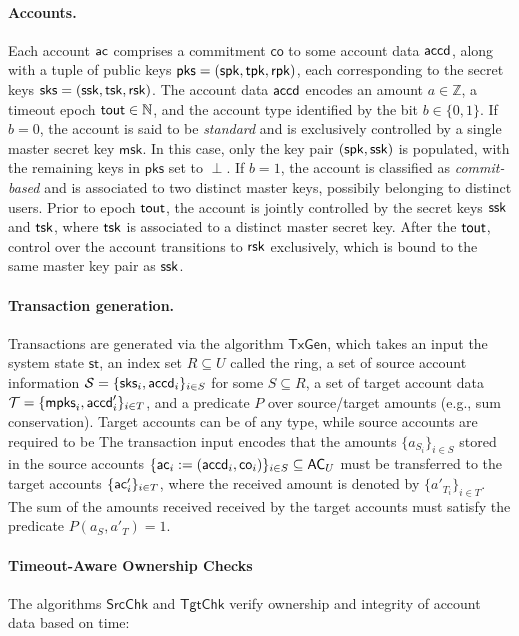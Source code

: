 \paragraph*{Accounts.}
Each account $\mathsf{ac}$ comprises a commitment $\mathsf{co}$ to some account data $\mathsf{accd}$, along with a tuple of public keys $\mathsf{pks} = ( \mathsf{spk}, \mathsf{tpk}, \mathsf{rpk} )$, each corresponding to the secret keys  $\mathsf{sks} = ( \mathsf{ssk}, \mathsf{tsk}, \mathsf{rsk} )$. The account data $\mathsf{accd}$ encodes an amount $a \in \mathbb{Z}$, a timeout epoch $\mathsf{tout} \in \mathbb{N}$, and the account type identified by the bit $b \in \{ 0, 1 \}$. If $b = 0$, the account is said to be \textit{standard} and is exclusively controlled by a single master secret key $\mathsf{msk}$. In this case, only the key pair $(\mathsf{spk}, \mathsf{ssk})$ is populated, with the remaining keys in $\mathsf{pks}$ set to $\perp$. If $b = 1$, the account is classified as \textit{commit-based} and is associated to two distinct master keys, possibily belonging to distinct users. Prior to epoch $\mathsf{tout}$, the account is jointly controlled by the secret keys $\mathsf{ssk}$ and $\mathsf{tsk}$, where $\mathsf{tsk}$ is associated to a distinct master secret key. After the $\mathsf{tout}$, control over the account transitions to  $\mathsf{rsk}$ exclusively, which is bound to the same master key pair as $\mathsf{ssk}$.

\paragraph*{Transaction generation.} Transactions are generated via the algorithm $\mathsf{TxGen}$, which takes an input the system state $\mathsf{st}$, an index set $R \subseteq U$ called the ring, a set of source account information  $\mathcal{S} = \{ \mathsf{sks}_i, \mathsf{accd}_i \}_{i \in S}$ for some $S \subseteq R$, a set of target account data $\mathcal{T} = \{ \mathsf{mpks}_i, \mathsf{accd}'_i \}_{i \in T}$, and a predicate $P$ over source/target amounts (e.g., sum conservation). Target accounts can be of any type, while source accounts are required to be
The transaction input encodes that the amounts $\{ a_{S_i} \}_{i \in S}$ stored in the source accounts $\{ \mathsf{ac}_i := (\mathsf{accd}_i, \mathsf{co}_i) \}_{i \in S} \subseteq \mathsf{AC}_U$ must be transferred to the target accounts $\{ \mathsf{ac}'_i \}_{i \in T}$, where the received amount is denoted by $\{ a'_{T_i} \}_{i \in T}$. The sum of the amounts received received by the target accounts must satisfy the predicate $P(a_S, a'_T) = 1$.

\paragraph*{Timeout-Aware Ownership Checks}
The algorithms $\mathsf{SrcChk}$ and $\mathsf{TgtChk}$ verify ownership and integrity of account data based on time:

